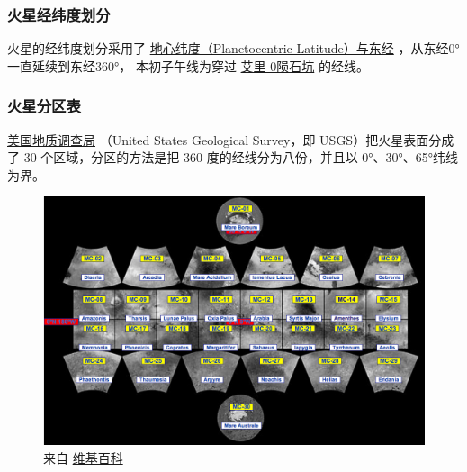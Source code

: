 \documentclass[letterpaper,10pt]{sphinxmanual}
\begin{document}
\subsubsection{火星经纬度划分}
\label{mars:id3}
火星的经纬度划分采用了 \href{http://en.wikipedia.org/wiki/Longitude\#Longitude\_on\_bodies\_other\_than\_Earth}{地心纬度（Planetocentric Latitude）与东经} ，从东经0°一直延续到东经360°，
本初子午线为穿过 \href{http://en.wikipedia.org/wiki/Airy-0}{艾里-0陨石坑} 的经线。


\subsubsection{火星分区表}
\label{mars:id5}
\href{http://zh.wikipedia.org/zh-cn/\%E7\%BE\%8E\%E5\%9C\%8B\%E5\%9C\%B0\%E8\%B3\%AA\%E8\%AA\%BF\%E6\%9F\%A5\%E5\%B1\%80}{美国地质调查局} （United States Geological Survey，即 USGS）把火星表面分成了 30 个区域，分区的方法是把 360 度的经线分为八份，并且以 0°、30°、65°纬线为界。
\begin{figure}[htbp]
\centering
\capstart

\includegraphics{USGSMarsSection.png}
\caption{来自 \href{http://en.wikipedia.org/wiki/Geography\_of\_Mars\#Map\_of\_quadrangles}{维基百科}}\end{figure}
\end{document}

